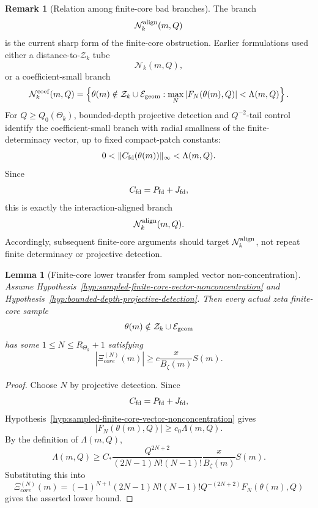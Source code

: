 \documentclass[11pt,a4paper]{amsart}
\def\core{core}%
\theoremstyle{plain}
\newtheorem{lemma}[theorem]{Lemma}
\theoremstyle{definition}
\newtheorem{remark}[theorem]{Remark}
\newcommand{\core}{\mathrm{core}}
\begin{document}
\begin{remark}[Relation among finite-core bad branches]
\label{rem:relation-among-finite-core-bad-branches}
The branch
\[
\mathcal N_k^{\rm align}(m,Q)
\]
is the current sharp form of the finite-core obstruction.  Earlier
formulations used either a distance-to-\(\mathcal Z_k\) tube
\[
\mathcal N_k(m,Q),
\]
or a coefficient-small branch
\[
\mathcal N_k^{\rm coef}(m,Q)
=
\left\{
\theta(m)\notin\mathcal Z_k\cup\mathcal E_{\rm geom}:
\max_N |F_N(\theta(m),Q)|<\Lambda(m,Q)
\right\}.
\]
For \(Q\ge Q_0(\Theta_k)\), bounded-depth projective detection and
\(Q^{-2}\)-tail control identify the coefficient-small branch with radial
smallness of the finite-determinacy vector, up to fixed compact-patch
constants:
\[
0<
\|C_{\rm fd}(\theta(m))\|_\infty
<
\Lambda(m,Q).
\]
Since
\[
C_{\rm fd}=P_{\rm fd}+J_{\rm fd},
\]
this is exactly the interaction-aligned branch
\[
\mathcal N_k^{\rm align}(m,Q).
\]
Accordingly, subsequent finite-core arguments should target
\(\mathcal N_k^{\rm align}\), not repeat finite determinacy or projective
detection.
\end{remark}

\begin{lemma}[Finite-core lower transfer from sampled vector non-concentration]
\label{lem:finite-core-lower-transfer-from-svnc-current}
Assume Hypothesis~\ref{hyp:sampled-finite-core-vector-nonconcentration} and
Hypothesis~\ref{hyp:bounded-depth-projective-detection}.
Then every actual zeta finite-core sample
\[
\theta(m)\notin\mathcal Z_k\cup\mathcal E_{\rm geom}
\]
has some \(1\le N\le R_{\Theta_k}+1\) satisfying
\[
|\Xi_{\core}^{(N)}(m)|
\ge
c
\frac{x}{B_\zeta(m)}S(m).
\]
\end{lemma}

\begin{proof}
Choose \(N\) by projective detection.  Since
\[
C_{\rm fd}=P_{\rm fd}+J_{\rm fd},
\]
Hypothesis~\ref{hyp:sampled-finite-core-vector-nonconcentration} gives
\[
|F_N(\theta(m),Q)|
\ge
c_0\Lambda(m,Q).
\]
By the definition of \(\Lambda(m,Q)\),
\[
\Lambda(m,Q)
\ge
C_*
\frac{Q^{2N+2}}
{(2N-1)N!(N-1)!}
\frac{x}{B_\zeta(m)}S(m).
\]
Substituting this into
\[
\Xi_{\core}^{(N)}(m)
=
(-1)^{N+1}
(2N-1)N!(N-1)!
Q^{-(2N+2)}
F_N(\theta(m),Q)
\]
gives the asserted lower bound.
\end{proof}
\end{document}
